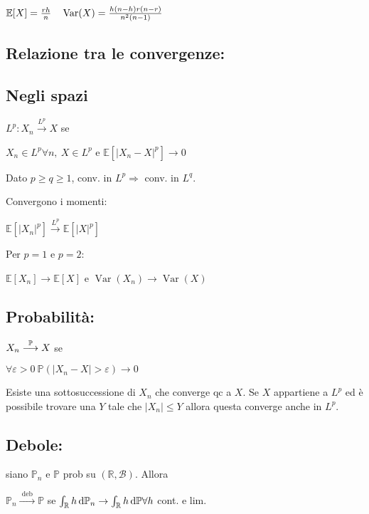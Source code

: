 $\mathbb{E}[X]=\frac{rh}{n}\quad\operatorname{Var}(X)=\frac{h(n-h)r(n-r)}{n^2(n-1)}$

\subsection{Relazione tra le convergenze:}



\subsection{Negli spazi} $L^{p}: X_{n} \stackrel{L^{p}}{\longrightarrow} X$ se

$X_{n} \in L^{p} \forall n,\ X \in L^{p}$ e $\mathbb{E}\left[\left|X_{n}-X\right|^{p}\right] \rightarrow 0$

Dato $p \geqslant q \geqslant 1$, conv. in $L^{p} \Longrightarrow$ conv. in $L^{q}$.

Convergono i momenti:

$\mathbb{E}\left[\left|X_{n}\right|^{p}\right] \stackrel{L^{p}}{\longrightarrow} \mathbb{E}\left[|X|^{p}\right]$

Per $p=1$ e $p=2$:

$\mathbb{E}\left[X_{n}\right] \rightarrow \mathbb{E}[X]$ e $\operatorname{Var}\left(X_{n}\right) \rightarrow \operatorname{Var}(X)$

\subsection{Probabilità:} $X_{n} \stackrel{\mathbb{P}}{\longrightarrow} X$ se

$\forall \varepsilon>0\ \mathbb{P}\left(\left|X_{n}-X\right|>\varepsilon\right) \rightarrow 0$

Esiste una sottosuccessione di $X_{n}$ che converge qc a $X$. Se $X$ appartiene a $L^{p}$ ed è possibile trovare una $Y$ tale che $\left|X_{n}\right| \leqslant Y$ allora questa converge anche in $L^{p}$.

\subsection{Debole:} siano $\mathbb{P}_{n}$ e $\mathbb{P}$ prob su $(\mathbb{R}, \mathcal{B})$. Allora

$\mathbb{P}_{n} \stackrel{\text { deb }}{\longrightarrow} \mathbb{P}$ se $\int_{\mathbb{R}} h\, \mathrm{d}\mathbb{P}_{n} \rightarrow \int_{\mathbb{R}} h\, \mathrm{d} \mathbb{P} \forall h$ cont. e lim.

